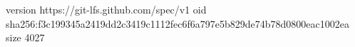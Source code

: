 version https://git-lfs.github.com/spec/v1
oid sha256:f3c199345a2419dd2c3419c1112fec6f6a797e5b829de74b78d0800eac1002ea
size 4027
